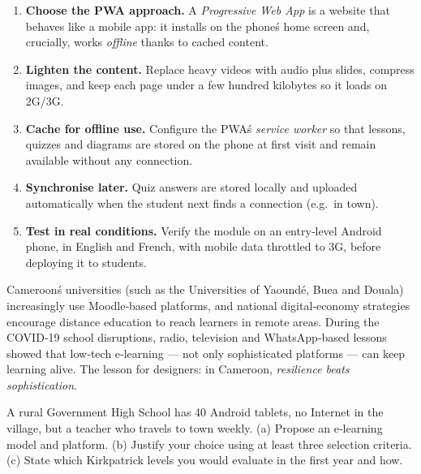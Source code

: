 \documentclass[11pt]{article}
\begin{document}
\begin{methode}
\begin{enumerate}
\item \textbf{Choose the PWA approach.} A \emph{Progressive Web App} is a website that behaves like a mobile app: it installs on the phone\'s home screen and, crucially, works \emph{offline} thanks to cached content.
\item \textbf{Lighten the content.} Replace heavy videos with audio plus slides, compress images, and keep each page under a few hundred kilobytes so it loads on 2G/3G.
\item \textbf{Cache for offline use.} Configure the PWA\'s \emph{service worker} so that lessons, quizzes and diagrams are stored on the phone at first visit and remain available without any connection.
\item \textbf{Synchronise later.} Quiz answers are stored locally and uploaded automatically when the student next finds a connection (e.g.\ in town).
\item \textbf{Test in real conditions.} Verify the module on an entry‑level Android phone, in English and French, with mobile data throttled to 3G, before deploying it to students.
\end{enumerate}
\end{methode}

\begin{savaistu}
Cameroon\'s universities (such as the Universities of Yaoundé, Buea and Douala) increasingly use Moodle‑based platforms, and national digital‑economy strategies encourage distance education to reach learners in remote areas. During the COVID‑19 school disruptions, radio, television and WhatsApp‑based lessons showed that low‑tech e‑learning — not only sophisticated platforms — can keep learning alive. The lesson for designers: in Cameroon, \emph{resilience beats sophistication}.
\end{savaistu}

\begin{exercice}
A rural Government High School has 40 Android tablets, no Internet in the village, but a teacher who travels to town weekly. (a) Propose an e‑learning model and platform. (b) Justify your choice using at least three selection criteria. (c) State which Kirkpatrick levels you would evaluate in the first year and how.
\end{exercice}
\end{document}

